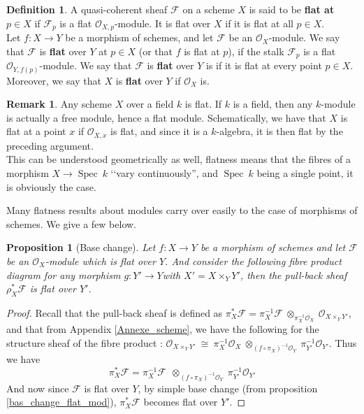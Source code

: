\documentclass{article}
\theoremstyle{plain}
\newtheorem{proposition}[theorem]{Proposition}
\theoremstyle{definition}
\newtheorem{definition}[theorem]{Definition}
\newtheorem{remark}{Remark}
\DeclareMathOperator{\Spec}{Spec}
\begin{document}
\begin{definition}
    A quasi-coherent sheaf $\mathcal{F}$ on a scheme $X$ is said to be \textbf{flat at $p\in X$} if $\mathcal{F}_p$ is a flat $\mathcal{O}_{X,p}$-module. It is flat over $X$ if it is flat at all $p\in X$.\\
    Let $f:X\rightarrow Y$ be a morphism of schemes, and let $\mathcal{F}$ be an $\mathcal{O}_X$-module. We say that $\mathcal{F}$ is \textbf{flat} over $Y$ at $p\in X$ (or that $f$ is flat at $p$), if the stalk $\mathcal{F}_p$ is a flat $\mathcal{O}_{Y,f(p)}$-module. We say that $\mathcal{F}$ is \textbf{flat } over $Y$ is if it is flat at every point $p\in X$. Moreover, we say that $X$ is \textbf{flat} over $Y$ if $\mathcal{O}_X$ is.
\end{definition}

\begin{remark}
    Any scheme $X$ over a field $k$ is flat. 
    If $k$ is a field, then any $k$-module is actually a free module, hence a flat module. Schematically, we have that $X$ is flat at a point $x$ if $\mathcal{O}_{X,x}$ is flat, and since it is a $k$-algebra, it is then flat by the preceding argument.\\
    This can be understood geometrically as well, flatness means that the fibres of a morphism $X\rightarrow\Spec\:k$ ‘‘vary continuously'', and $\Spec\:k$ being a single point, it is obviously the case.
\end{remark}




\noindent Many flatness results about modules carry over easily to the case of morphisms of schemes. 
We give a few below.

\begin{proposition}[Base change]
\label{base_change_flat_morphism}
    Let $f: X\rightarrow Y$ be a morphism of schemes and let $\mathcal{F}$ be an $\mathcal{O}_X$-module which is flat over $Y$. 
    And consider the following fibre product diagram for any morphism $g:Y'\rightarrow Y$with $X'= X\times_YY'$,
    then the pull-back sheaf $\rho_X^*\mathcal{F}$ is flat over $Y'$.
\end{proposition}
\begin{proof}
    Recall that the pull-back sheaf is defined as $\pi_X^*\mathcal{F} = \pi_X^{-1}\mathcal{F}\:\otimes_{\pi_X^{-1}\mathcal{O}_X}\:\mathcal{O}_{X\times_YY'}$, and that from Appendix \ref{Annexe_scheme}, we have the following for the structure sheaf of the fibre product : 
    $\mathcal{O}_{X\times_YY'} \:\cong\: \pi_X^{-1}\mathcal{O}_X \: \otimes_{(f\circ \pi_X)^{-1}\mathcal{O}_Y}\: \pi_{Y'}^{-1}\mathcal{O}_{Y'}$. 
    Thus we have
    $$\pi_X^*\mathcal{F} = \pi_X^{-1}\mathcal{F}\:\: \otimes_{(f\circ \pi_X)^{-1}\mathcal{O}_Y}\: \pi_{Y'}^{-1}\mathcal{O}_{Y'}$$
    And now since $\mathcal{F}$ is flat over $Y$, by simple base change (from proposition \ref{bas_change_flat_mod}), $\pi_X^*\mathcal{F}$ becomes flat over $Y'$.
\end{proof}
\end{document}

